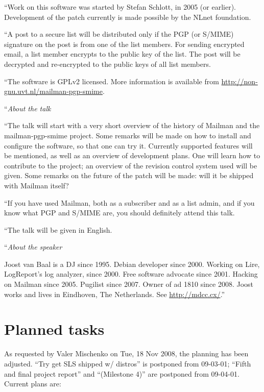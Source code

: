 \documentclass[a4]{article}
\begin{document}
``Work on this software was started by Stefan Schlott, in 2005 (or earlier).
Development of the patch currently is made possible by the NLnet foundation.

``A post to a secure list will be distributed only if the PGP (or S/MIME)
signature on the post is from one of the list members.  For sending encrypted
email, a list member encrypts to the public key of the list.  The post will be
decrypted and re-encrypted to the public keys of all list members.

``The software is GPLv2 licensed.  More information is available from
\url{http://non-gnu.uvt.nl/mailman-pgp-smime}.

``\textit{About the talk}

``The talk will start with a very short overview of the history of Mailman and
the mailman-pgp-smime project.  Some remarks will be made on how to install and
configure the software, so that one can try it.  Currently supported features
will be mentioned, as well as an overview of development plans.  One will learn
how to contribute to the project; an overview of the revision control system
used will be given.  Some remarks on the future of the patch will be made: will
it be shipped with Mailman itself?

``If you have used Mailman, both as a subscriber and as a list admin, and if
you know what PGP and S/MIME are, you should definitely attend this talk.

``The talk will be given in English.

``\textit{About the speaker}

Joost van Baal is a DJ since 1995.  Debian
developer since 2000.  Working on Lire, LogReport's log analyzer, since 2000.
Free software advocate since 2001. Hacking on Mailman since 2005.  Pugilist
since 2007.  Owner of ad 1810 since 2008.  Joost works and lives in Eindhoven,
The Netherlands. See \url{http://mdcc.cx/}.''


\section{Planned tasks}

As requested by Valer Mischenko on Tue, 18 Nov 2008, the planning has been
adjusted. ``Try get SLS shipped w/ distros'' is postponed from 09-03-01;
``Fifth and final project report'' and ``(Milestone 4)'' are postponed from
09-04-01.  Current plans are:
\end{document}
